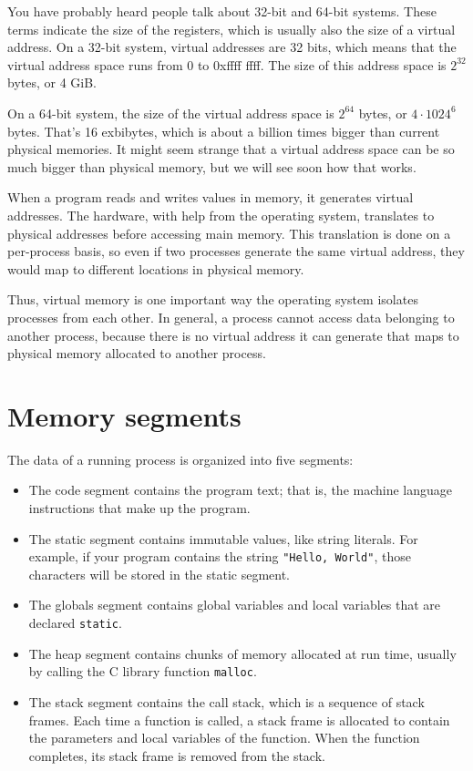 \documentclass[12pt]{book}
\begin{document}
You have probably heard people talk about 32-bit and 64-bit systems.
These terms indicate the size of the registers, which is usually also
the size of a virtual address.  On a 32-bit system, virtual addresses
are 32 bits, which means that the virtual address space runs from 0 to
0xffff ffff.  The size of this address space is $2^{32}$ bytes, or 4
GiB.

On a 64-bit system, the size of the virtual address space is $2^{64}$
bytes, or $4 \cdot 1024^6$ bytes.  That's 16 exbibytes, which is
about a billion times bigger than current physical memories.  It might
seem strange that a virtual address space can be so much bigger
than physical memory, but we will see soon how that works.

When a program reads and writes values in memory, it generates virtual
addresses.  The hardware, with help from the operating system,
translates to physical addresses before accessing main memory.  This
translation is done on a per-process basis, so even if two processes
generate the same virtual address, they would map to different
locations in physical memory.

Thus, virtual memory is one important way the operating system
isolates processes from each other.  In general, a process cannot
access data belonging to another process, because there is no
virtual address it can generate that maps to physical memory
allocated to another process.



\section{Memory segments}

The data of a running process is organized into five segments:

\begin{itemize}

\item The code segment contains the program text; that is, the
  machine language instructions that make up the program.

\item The static segment contains immutable values, like string
literals.  For example, if your program contains the string
{\tt "Hello, World"}, those characters will be stored in the
static segment.

\item The globals segment contains global variables and local variables that are declared {\tt static}.

\item The heap segment contains chunks of memory allocated
  at run time, usually by calling the C library function
  {\tt malloc}.

\item The stack segment contains the call stack, which is a
  sequence of stack frames.  Each time a function is called, a stack
  frame is allocated to contain the 
  parameters and local variables of the function.  When the function
  completes, its stack frame is removed from the stack.

\end{itemize}
\end{document}
